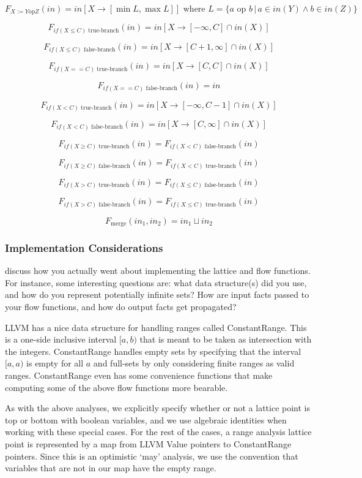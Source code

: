 \documentclass{article}
\theoremstyle{definition}
\begin{document}
\[ F_{X:= Y \text{op} Z}(in) = in[X \rightarrow [\min L, \max L]]\text{ where } L = \{ a \text{ op } b \, | \, a \in in(Y) \wedge b \in in(Z)  \}\]

\[ F_{if( X \leq C) \text{ true-branch}}(in) = in[X \rightarrow [-\infty, C] \cap in(X)  ] \]

\[ F_{if( X \leq C) \text{ false-branch}}(in) = in[X \rightarrow [C + 1, \infty] \cap in(X)  ]\]

\[ F_{if( X == C) \text{ true-branch}}(in) = in[X \rightarrow [C, C] \cap in(X)  ]\]

\[ F_{if( X == C) \text{ false-branch}}(in) = in \]

\[ F_{if( X < C) \text{ true-branch}}(in) =in[X \rightarrow [-\infty, C -1] \cap in(X)  ] \]

\[ F_{if( X < C) \text{ false-branch}}(in) =  in[X \rightarrow [C, \infty] \cap in(X)  ]\]

\[ F_{if( X \geq C) \text{ true-branch}}(in) =  F_{if( X < C) \text{ false-branch}}(in) \]

\[ F_{if( X \geq C) \text{ false-branch}}(in) =  F_{if( X < C) \text{ true-branch}}(in)\]

\[ F_{if( X > C) \text{ true-branch}}(in) =   F_{if( X \leq C) \text{ false-branch}}(in)\]

\[ F_{if( X > C) \text{ false-branch}}(in) =   F_{if( X \leq C) \text{ true-branch}}(in)\]

\[ F_{\text{merge}}(in_1, in_2) = in_1 \sqcup in_2 \]

\subsubsection{Implementation Considerations}
\begin{framed}
  discuss how you actually went about implementing the lattice and
  flow functions. For instance, some interesting questions are: what
  data structure(s) did you use, and how do you represent potentially
  infinite sets? How are input facts passed to your flow functions,
  and how do output facts get propagated?
\end{framed}

LLVM has a nice data structure for handling ranges called ConstantRange. This is a one-side inclusive interval $[a, b)$ that is meant to be taken as intersection with the integers. ConstantRange handles empty sets by specifying that the interval $[a,a)$ is empty for all $a$ and full-sets by only considering finite ranges as valid ranges. ConstantRange even has some convenience functions that make computing some of the above flow functions more bearable. 

As with the above analyses, we explicitly specify whether or not a lattice point is top or bottom with boolean variables, and we use algebraic identities when working with these special cases. For the rest of the cases, a range analysis lattice point is represented by a map from LLVM Value pointers to ConstantRange pointers. Since this is an optimistic `may' analysis, we use the convention that variables that are {not} in our map have the empty range.

 
\end{document}

